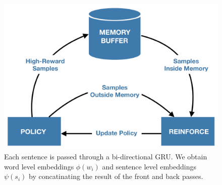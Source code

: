 \begin{figure}[!t]
\centering
\includegraphics[scale=1.1]{assets/figures/rl_update.pdf}
\caption{Each sentence is passed through a bi-directional GRU. We obtain word level embeddings $\phi(w_i)$ and sentence level embeddings $\psi(s_i)$ by concatinating the result of the front and back passes.}
\label{fig:embed}
\end{figure}
